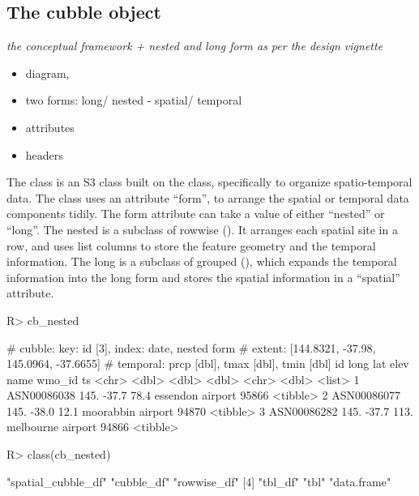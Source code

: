 \documentclass[
  shortnames]{jss}
\providecommand{\tightlist}{%
  \setlength{\itemsep}{0pt}\setlength{\parskip}{0pt}}
\begin{document}
\hypertarget{the-cubble-object}{%
\subsection{The cubble object}\label{the-cubble-object}}

\emph{the conceptual framework + nested and long form as per the design vignette}

\begin{itemize}
\tightlist
\item
  diagram,
\item
  two forms: long/ nested - spatial/ temporal
\item
  attributes
\item
  headers
\end{itemize}

The  class is an S3 class \citep{advr} built on the  class, specifically to organize spatio-temporal data. The  class uses an attribute ``form'', to arrange the spatial or temporal data components tidily. The form attribute can take a value of either ``nested'' or ``long''. The nested  is a subclass of rowwise  (). It arranges each spatial site in a row, and uses list columns to store the feature geometry and the temporal information. The long  is a subclass of grouped  (), which expands the temporal information into the long form and stores the spatial information in a ``spatial'' attribute.

\begin{CodeChunk}
\begin{CodeInput}
R> cb_nested
\end{CodeInput}
\begin{CodeOutput}
# cubble:   key: id [3], index: date, nested form
# extent:   [144.8321, -37.98, 145.0964, -37.6655]
# temporal: prcp [dbl], tmax [dbl], tmin [dbl]
  id           long   lat  elev name              wmo_id ts      
  <chr>       <dbl> <dbl> <dbl> <chr>              <dbl> <list>  
1 ASN00086038  145. -37.7  78.4 essendon airport   95866 <tibble>
2 ASN00086077  145. -38.0  12.1 moorabbin airport  94870 <tibble>
3 ASN00086282  145. -37.7 113.  melbourne airport  94866 <tibble>
\end{CodeOutput}
\begin{CodeInput}
R> class(cb_nested)
\end{CodeInput}
\begin{CodeOutput}
[1] "spatial_cubble_df" "cubble_df"         "rowwise_df"       
[4] "tbl_df"            "tbl"               "data.frame"       
\end{CodeOutput}
\end{CodeChunk}
\end{document}
